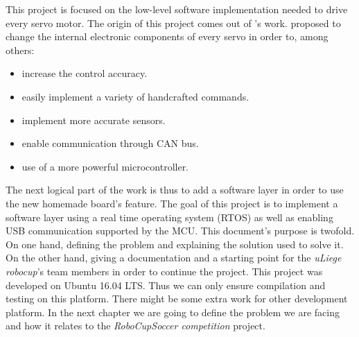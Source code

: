 \documentclass[12pt,a4paper]{report}
\begin{document}
This project is focused on the low-level software implementation needed to drive every servo motor. 
The origin of this project comes out of \cite{masterGL}'s work. \cite{masterGL} proposed to change the internal electronic components of every servo in order to, among others:
\begin{itemize}
\item increase the control accuracy.
\item easily implement a variety of handcrafted commands.
\item implement more accurate sensors.
\item enable communication through CAN bus.
\item use of a more powerful microcontroller.
\end{itemize}
The next logical part of the work is thus to add a software layer in order to use the new homemade board's feature.\newline
The goal of this project is to implement a software layer using a real time operating system (RTOS) as well as enabling USB communication supported by the MCU.\newline
This document's purpose is twofold. On one hand, defining the problem and explaining the solution used to solve it. On the other hand, giving a documentation and a starting point for the \emph{uLiege robocup}'s team members in order to continue the project.\newline
This project was developed on Ubuntu 16.04 LTS. Thus we can only ensure compilation and testing on this platform. There might be some extra work for other development platform.\newline
In the next chapter we are going to define the problem we are facing and how it relates to the \emph{RoboCupSoccer competition} project.\newpage
\end{document}
